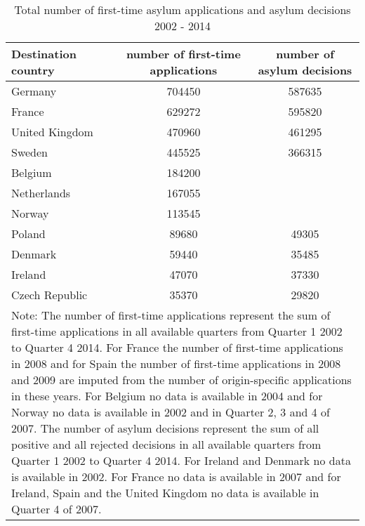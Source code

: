\begin{table}[!ht]\centering \footnotesize
\caption{Total number of first-time asylum applications and asylum decisions 2002 - 2014}
\begin{tabular}{l*{2}{c}}
\hline\hline
Destination country & number of first-time applications & number of asylum decisions \\
\hline
Germany        	& 704450 	& 587635 \\
[0,5em]
France			& 629272 	& 595820 \\
[0,5em]
United Kingdom 	& 470960 	& 461295 \\
[0,5em]
Sweden 			& 445525 	& 366315 \\
[0,5em]
Belgium        	& 184200 	& 		 \\
[0,5em]
Netherlands		& 167055 	& 		 \\
[0,5em]
Norway        	& 113545 	& 		 \\
[0,5em]
Poland			& 89680 	& 49305	 \\
[0,5em]
Denmark        	& 59440 	& 35485 \\
[0,5em]
Ireland			& 47070 	& 37330 \\	
[0,5em]
Czech Republic	& 35370		& 29820 \\			
\hline\hline
\multicolumn{3}{p{13,5cm}}{Note: The number of first-time applications represent the sum of  first-time applications in all available quarters from Quarter 1 2002 to Quarter 4 2014. For France the number of first-time applications in 2008 and for  Spain the number of first-time applications in 2008 and 2009 are imputed from the number of origin-specific applications in these years. For Belgium no data is available in 2004 and for Norway no data is available in 2002 and in Quarter 2, 3 and 4 of 2007. The number of asylum decisions represent the sum of all positive and all rejected decisions in all available quarters from Quarter 1 2002 to Quarter 4 2014. For Ireland and Denmark no data is available in 2002. For France no data is available in 2007 and for Ireland, Spain and the United Kingdom no data is available in Quarter 4 of 2007.}
\end{tabular}
\label{ftapp_and_dec_by_destination}
\end{table}